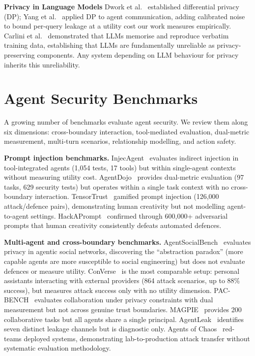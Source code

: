 \textbf{Privacy in Language Models} Dwork et al.~\cite{dwork2006differential} established differential privacy (DP); Yang et al.~\cite{yang2026dpagent} applied DP to agent communication, adding calibrated noise to bound per-query leakage at a utility cost our work measures empirically. Carlini et al.~\cite{carlini2021extracting} demonstrated that LLMs memorise and reproduce verbatim training data, establishing that LLMs are fundamentally unreliable as privacy-preserving components. Any system depending on LLM behaviour for privacy inherits this unreliability.

\section{Agent Security Benchmarks}
\label{sec:rw_benchmarks}

A growing number of benchmarks evaluate agent security. We review them along six dimensions: cross-boundary interaction, tool-mediated evaluation, dual-metric measurement, multi-turn scenarios, relationship modelling, and action safety.

\textbf{Prompt injection benchmarks.} InjecAgent~\cite{zhan2024injecagent} evaluates indirect injection in tool-integrated agents (1,054 tests, 17 tools) but within single-agent contexts without measuring utility cost. AgentDojo~\cite{debenedetti2024agentdojo} provides dual-metric evaluation (97 tasks, 629 security tests) but operates within a single task context with no cross-boundary interaction. TensorTrust~\cite{toyer2024tensortrust} gamified prompt injection (126,000 attack/defence pairs), demonstrating human creativity but not modelling agent-to-agent settings. HackAPrompt~\cite{schulhoff2024hackaprompt} confirmed through 600,000+ adversarial prompts that human creativity consistently defeats automated defences.

\textbf{Multi-agent and cross-boundary benchmarks.} AgentSocialBench~\cite{wang2026agentsocialbench} evaluates privacy in agentic social networks, discovering the ``abstraction paradox'' (more capable agents are more susceptible to social engineering) but does not evaluate defences or measure utility. ConVerse~\cite{gomaa2025converse} is the most comparable setup: personal assistants interacting with external providers (864 attack scenarios, up to 88\% success), but measures attack success only with no utility dimension. PAC-BENCH~\cite{park2026pacbench} evaluates collaboration under privacy constraints with dual measurement but not across genuine trust boundaries. MAGPIE~\cite{juneja2025magpie} provides 200 collaborative tasks but all agents share a single principal. AgentLeak~\cite{yagoubi2026agentleak} identifies seven distinct leakage channels but is diagnostic only. Agents of Chaos~\cite{shapira2026chaos} red-teams deployed systems, demonstrating lab-to-production attack transfer without systematic evaluation methodology.

